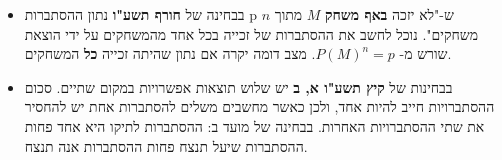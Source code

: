 \documentclass[12pt,a4paper]{article}
\begin{document}
\begin{itemize}
\item
בבחינה של
\textbf{חורף תשע"ו}
נתון ההסתברות p ש-"לא יזכה
\textbf{באף משחק}
$M$
מתוך 
$n$
משחקים". נוכל לחשב את ההסתברות של זכייה בכל אחד מהמשחקים על ידי הוצאת שורש מ-%
$P(M)^n=p$.
מצב דומה יקרה אם נתון שהיתה זכייה 
\textbf{כל}
המשחקים.

\item
בבחינות של 
\textbf{קיץ תשע"ו א, ב}
יש שלוש תוצאות אפשרויות במקום שתיים. סכום ההסתברויות חייב להיות אחד, ולכן כאשר מחשבים משלים להסתברות אחת יש להחסיר את שתי ההסתברויות האחרות. בבחינה של מועד ב: ההסתברות לתיקו היא אחד פחות ההסתברות שיעל תנצח פחות ההסתברות אנה תנצח.
\end{itemize}
\end{document}
